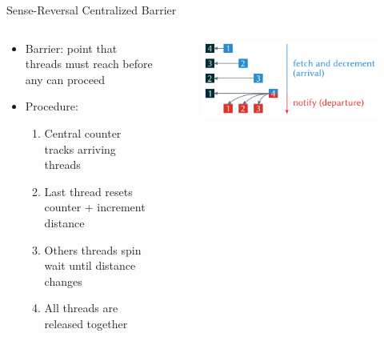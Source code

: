\begin{frame}{Sense-Reversal Centralized Barrier}
  \begin{columns}[c] %
    \begin{column}{0.5\textwidth}
      \begin{itemize}
        \item Barrier: point that threads must reach before any can proceed
        \item Procedure:
        \begin{enumerate}
          \item Central counter tracks arriving threads
          \item Last thread resets counter + increment distance
          \item Others threads spin wait until distance changes
          \item All threads are released together
        \end{enumerate}
      \end{itemize}
    \end{column}

    \begin{column}{0.5\textwidth}
      \begin{figure}
        \centering
        \includegraphics[width=\linewidth]{images/barrier.png}
      \end{figure}
    \end{column}
  \end{columns}
\end{frame}